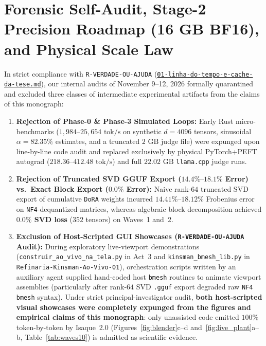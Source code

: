 \documentclass[10pt,a4paper]{article}
\begin{document}
\section{Forensic Self-Audit, Stage-2 Precision Roadmap (16 GB BF16), and Physical Scale Law}

In strict compliance with \texttt{R-VERDADE-OU-AJUDA} (\href{https://drive.google.com/file/d/16-3o4ykaOOKaW-S2VTHzpE7Uhj1BA0tl/view?usp=drivesdk}{\texttt{01-linha-do-tempo-e-cache-da-tese.md}}), our internal audits of November 9--12, 2026 formally quarantined and excluded three classes of intermediate experimental artifacts from the claims of this monograph:
\begin{enumerate}
  \item \textbf{Rejection of Phase-0 \& Phase-3 Simulated Loops:} Early Rust micro-benchmarks ($1,984\text{--}25,654\text{ tok/s}$ on synthetic $d=4096$ tensors, sinusoidal $\alpha=82.35\%$ estimates, and a truncated $2\text{ GB}$ judge file) were expunged upon line-by-line code audit and replaced exclusively by physical PyTorch+PEFT autograd ($218.36\text{--}412.48\text{ tok/s}$) and full $22.02\text{ GB}$ \texttt{llama.cpp} judge runs.
  \item \textbf{Rejection of Truncated SVD GGUF Export ($14.4\%\text{--}18.1\%$ Error) vs.\ Exact Block Export ($0.0\%$ Error):} Naive rank-$64$ truncated SVD export of cumulative \texttt{DoRA} weights incurred $14.41\%\text{--}18.12\%$ Frobenius error on \texttt{NF4}-dequantized matrices, whereas algebraic block decomposition achieved \textbf{$0.0\%$ SVD loss} ($352$ tensors) on Waves~1 and~2.
  \item \textbf{Exclusion of Host-Scripted GUI Showcases (\texttt{R-VERDADE-OU-AJUDA} Audit):} During exploratory live-viewport demonstrations (\texttt{construir\_\allowbreak{}ao\_\allowbreak{}vivo\_\allowbreak{}na\_\allowbreak{}tela.py} in Act~3 and \texttt{kinsman\_\allowbreak{}bmesh\_\allowbreak{}lib.py} in \texttt{Refinaria-Kinsman-Ao-Vivo-01}), orchestration scripts written by an auxiliary agent supplied hand-coded host \texttt{bmesh} routines to animate viewport assemblies (particularly after rank-$64$ SVD \texttt{.gguf} export degraded raw \texttt{NF4} \texttt{bmesh} syntax). Under strict principal-investigator audit, \textbf{both host-scripted visual showcases were completely expunged from the figures and empirical claims of this monograph}: only unassisted code emitted $100\%$ token-by-token by Isaque~2.0 (Figures~\ref{fig:blender}c--d and~\ref{fig:live_plant}a--b, Table~\ref{tab:waves10}) is admitted as scientific evidence.
\end{enumerate}
\end{document}
